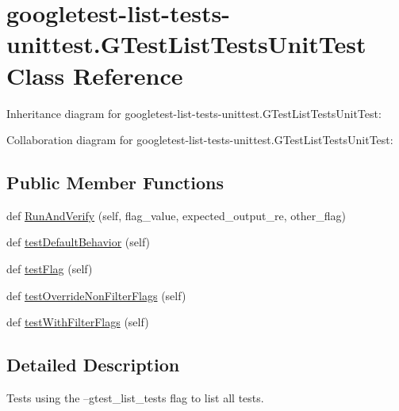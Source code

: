 \hypertarget{classgoogletest-list-tests-unittest_1_1GTestListTestsUnitTest}{}\section{googletest-\/list-\/tests-\/unittest.G\+Test\+List\+Tests\+Unit\+Test Class Reference}
\label{classgoogletest-list-tests-unittest_1_1GTestListTestsUnitTest}


Inheritance diagram for googletest-\/list-\/tests-\/unittest.G\+Test\+List\+Tests\+Unit\+Test\+:


Collaboration diagram for googletest-\/list-\/tests-\/unittest.G\+Test\+List\+Tests\+Unit\+Test\+:
\subsection*{Public Member Functions}
\begin{DoxyCompactItemize}
\item 
def \hyperlink{classgoogletest-list-tests-unittest_1_1GTestListTestsUnitTest_a6630e10404717e8edd3df1439fb0d81c}{Run\+And\+Verify} (self, flag\+\_\+value, expected\+\_\+output\+\_\+re, other\+\_\+flag)
\item 
def \hyperlink{classgoogletest-list-tests-unittest_1_1GTestListTestsUnitTest_aacba8c9eaef1b649ba40ede17218d0f1}{test\+Default\+Behavior} (self)
\item 
def \hyperlink{classgoogletest-list-tests-unittest_1_1GTestListTestsUnitTest_a8f5b423963d862456348a8903ccdfade}{test\+Flag} (self)
\item 
def \hyperlink{classgoogletest-list-tests-unittest_1_1GTestListTestsUnitTest_a961396c3c2b8d22f6491beb5348594aa}{test\+Override\+Non\+Filter\+Flags} (self)
\item 
def \hyperlink{classgoogletest-list-tests-unittest_1_1GTestListTestsUnitTest_adb60d2295fee8ed4af2a5ee1a32e5778}{test\+With\+Filter\+Flags} (self)
\end{DoxyCompactItemize}


\subsection{Detailed Description}
\begin{DoxyVerb}Tests using the --gtest_list_tests flag to list all tests.\end{DoxyVerb}
 

